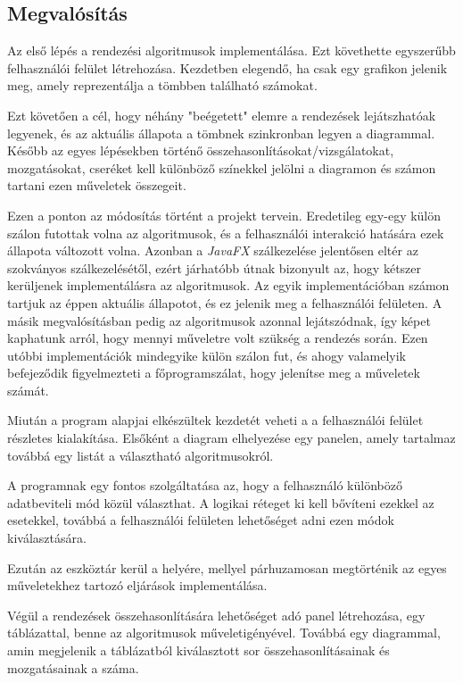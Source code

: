 \documentclass{elteikthesis}
\begin{document}
\subsection{Megvalósítás}
Az első lépés a rendezési algoritmusok implementálása.
Ezt követhette egyszerűbb felhasználói felület létrehozása. Kezdetben elegendő, ha csak egy grafikon jelenik meg, amely reprezentálja a tömbben található számokat.\par
Ezt követően a cél, hogy néhány "beégetett" elemre a rendezések lejátszhatóak legyenek, és az aktuális állapota a tömbnek szinkronban legyen a diagrammal. Később az egyes lépésekben történő összehasonlításokat/vizsgálatokat, mozgatásokat, cseréket kell különböző színekkel jelölni a diagramon és számon tartani ezen műveletek összegeit.\par
Ezen a ponton az módosítás történt a projekt tervein. Eredetileg egy-egy külön szálon futottak volna az algoritmusok, és a felhasználói interakció hatására ezek állapota változott volna. Azonban a \emph{JavaFX} szálkezelése jelentősen eltér az szokványos szálkezelésétől, ezért járhatóbb útnak bizonyult az, hogy kétszer kerüljenek implementálásra az algoritmusok. Az egyik implementációban számon tartjuk az éppen aktuális állapotot, és ez jelenik meg a felhasználói felületen. A másik megvalósításban pedig az algoritmusok azonnal lejátszódnak, így képet kaphatunk arról, hogy mennyi műveletre volt szükség a rendezés során. Ezen utóbbi implementációk mindegyike külön szálon fut, és ahogy valamelyik befejeződik figyelmezteti a főprogramszálat, hogy jelenítse meg a műveletek számát.\par
Miután a program alapjai elkészültek kezdetét veheti a a felhasználói felület részletes kialakítása. Elsőként a diagram elhelyezése egy panelen, amely tartalmaz továbbá egy listát a választható algoritmusokról.\par
A programnak egy fontos szolgáltatása az, hogy a felhasználó különböző adatbeviteli mód közül választhat. A logikai réteget ki kell bővíteni ezekkel az esetekkel, továbbá a felhasználói felületen lehetőséget adni ezen módok kiválasztására.\par
Ezután az eszköztár kerül a helyére, mellyel párhuzamosan megtörténik az egyes műveletekhez tartozó eljárások implementálása.\par
Végül a rendezések összehasonlítására lehetőséget adó panel létrehozása, egy táblázattal, benne az algoritmusok műveletigényével. Továbbá egy diagrammal, amin megjelenik a táblázatból kiválasztott sor összehasonlításainak és mozgatásainak a száma.
\end{document}
